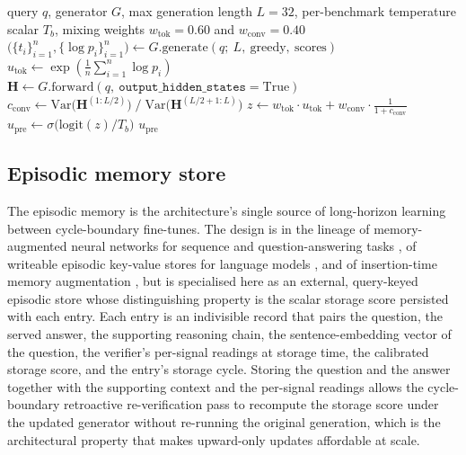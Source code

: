 \begin{algorithm}[!htbp]
\caption[Pre-routing confidence fusion (Stage~1).]{Pre-routing confidence fusion (Stage~1).}
\label{alg:pre-routing}
\begin{algorithmic}[1]
\Require query $q$, generator $G$, max generation length $L = 32$, per-benchmark temperature scalar $T_{b}$, mixing weights $w_{\text{tok}} = 0.60$ and $w_{\text{conv}} = 0.40$
\State $\big(\{t_{i}\}_{i=1}^{n}, \{\log p_{i}\}_{i=1}^{n}\big) \gets G.\mathrm{generate}(q;\ L,\ \text{greedy},\ \text{scores})$ 
\State $u_{\text{tok}} \gets \exp\!\left(\tfrac{1}{n}\sum_{i=1}^{n} \log p_{i}\right)$ 
\State $\mathbf{H} \gets G.\mathrm{forward}(q,\ \texttt{output\_hidden\_states}{=}\text{True})$ 
\State $c_{\text{conv}} \gets \mathrm{Var}\big(\mathbf{H}^{(1:L/2)}\big) \;/\; \mathrm{Var}\big(\mathbf{H}^{(L/2+1:L)}\big)$ 
\State $z \gets w_{\text{tok}}\cdot u_{\text{tok}} + w_{\text{conv}}\cdot \tfrac{1}{1+c_{\text{conv}}}$ 
\State $u_{\text{pre}} \gets \sigma\!\big(\mathrm{logit}(z)/T_{b}\big)$ 
\State \Return $u_{\text{pre}}$
\end{algorithmic}
\end{algorithm}

\subsection{Episodic memory store}
\label{sec:memory-store}

The episodic memory is the architecture's single source of long-horizon learning between cycle-boundary fine-tunes. The design is in the lineage of memory-augmented neural networks for sequence and question-answering tasks \cite{weston2015memory,graves2014neural,graves2016differentiable}, of writeable episodic key-value stores for language models \cite{larimar2024das}, and of insertion-time memory augmentation \cite{xu2025amem}, but is specialised here as an external, query-keyed episodic store whose distinguishing property is the scalar storage score persisted with each entry. Each entry is an indivisible record that pairs the question, the served answer, the supporting reasoning chain, the sentence-embedding vector of the question, the verifier's per-signal readings at storage time, the calibrated storage score, and the entry's storage cycle. Storing the question and the answer together with the supporting context and the per-signal readings allows the cycle-boundary retroactive re-verification pass to recompute the storage score under the updated generator without re-running the original generation, which is the architectural property that makes upward-only updates affordable at scale.

